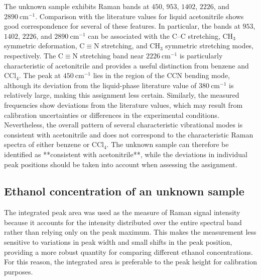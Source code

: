 \documentclass[11pt,a4paper]{article}
\begin{document}
The unknown sample exhibits Raman bands at \(450\), \(953\), \(1402\), \(2226\), and \(2890~\mathrm{cm^{-1}}\). Comparison with the literature values for liquid acetonitrile shows good correspondence for several of these features. In particular, the bands at \(953\), \(1402\), \(2226\), and \(2890~\mathrm{cm^{-1}}\) can be associated with the C--C stretching, CH$_3$ symmetric deformation, C$\equiv$N stretching, and CH$_3$ symmetric stretching modes, respectively. The C$\equiv$N stretching band near \(2226~\mathrm{cm^{-1}}\) is particularly characteristic of acetonitrile and provides a useful distinction from benzene and $\mathrm{CCl_4}$. The peak at \(450~\mathrm{cm^{-1}}\) lies in the region of the CCN bending mode, although its deviation from the liquid-phase literature value of \(380~\mathrm{cm^{-1}}\) is relatively large, making this assignment less certain. Similarly, the measured frequencies show deviations from the literature values, which may result from calibration uncertainties or differences in the experimental conditions. Nevertheless, the overall pattern of several characteristic vibrational modes is consistent with acetonitrile and does not correspond to the characteristic Raman spectra of either benzene or $\mathrm{CCl_4}$. The unknown sample can therefore be identified as **consistent with acetonitrile**, while the deviations in individual peak positions should be taken into account when assessing the assignment.
\subsection{Ethanol concentration of an unknown sample}

The integrated peak area was used as the measure of Raman signal intensity because it accounts for the intensity distributed over the entire spectral band rather than relying only on the peak maximum. This makes the measurement less sensitive to variations in peak width and small shifts in the peak position, providing a more robust quantity for comparing different ethanol concentrations. For this reason, the integrated area is preferable to the peak height for calibration purposes.
\end{document}
